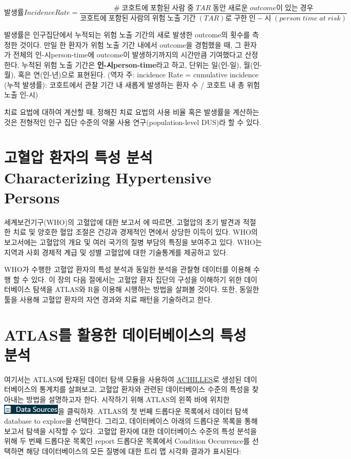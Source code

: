 \documentclass[10.5pt]{book}
\theoremstyle{definition}
\theoremstyle{definition}
\theoremstyle{definition}
\theoremstyle{remark}
\begin{document}
\[
발생률 Incidence Rate= \frac{\#\;코호트에\;포함된\;사람\;중\;TAR\;동안\;새로운\;outcome이\;있는\;경우}{코호트에\;포함된\;사람의\;위험\;노출\;기간\;(TAR)로\;구한\;인-시\;(person\;time\;at\;risk)}
\]

발생률은 인구집단에서 누적되는 위험 노출 기간의 새로 발생한 outcome의
횟수를 측정한 것이다. 만일 한 환자가 위험 노출 기간 내에서 outcome을
경험했을 때, 그 환자가 전체의 인-시person-time에 outcome이
발생하기까지의 시간만큼 기여했다고 산정한다. 누적된 위험 노출 기간은
\textbf{인-시person-time}라고 하고, 단위는 일(인-일), 월(인-월), 혹은
연(인-년)으로 표현된다.   (역자
주: incidence Rate = cumulative incidence (누적 발생률): 코호트에서 관찰
기간 내 새롭게 발생하는 환자 수 / 코호트 내 총 위험 노출 인-시)

치료 요법에 대하여 계산할 때, 정해진 치료 요법의 사용 비율 혹은 발생률을
계산하는 것은 전형적인 인구 집단 수준의 약물 사용 연구(population-level
DUS)라 할 수 있다.

\section{고혈압 환자의 특성 분석 Characterizing Hypertensive
Persons}\label{----characterizing-hypertensive-persons}

세계보건기구(WHO)의 고혈압에 대한 보고서 \citep{WHOHypertension} 에
따르면, 고혈압의 초기 발견과 적절한 치료 및 양호한 혈압 조절은 건강과
경제적인 면에서 상당한 이득이 있다. WHO의 보고서에는 고혈압의 개요 및
여러 국가의 질병 부담의 특징을 보여주고 있다. WHO는 지역과 사회 경제적
계급 및 성별 고혈압에 대한 기술통계를 제공하고 있다.

WHO가 수행한 고혈압 환자의 특성 분석과 동일한 분석을 관찰형 데이터를
이용해 수행 할 수 있다. 이 장의 다음 절에서는 고혈압 환자 집단의 구성을
이해하기 위한 데이터베이스 탐색을 ATLAS와 R을 이용해 시행하는 방법을
살펴볼 것이다. 또한, 동일한 툴을 사용해 고혈압 환자의 자연 경과와 치료
패턴을 기술하려고 한다.

\section{ATLAS를 활용한 데이터베이스의 특성 분석}\label{atlas----}

여기서는 ATLAS에 탑재된 데이터 탐색 모듈을 사용하여
\href{https://github.com/OHDSI/Achilles}{ACHILLES}로 생성된
데이터베이스의 통계치를 살펴보고, 고혈압 환자와 관련된 데이터베이스
수준의 특성을 찾아내는 방법을 설명하고자 한다. 시작하기 위해 ATLAS의
왼쪽 바에 위치한
\includegraphics{images/Characterization/atlasDataSourcesMenuItem.png}을
클릭하자. ATLAS의 첫 번째 드롭다운 목록에서 데이터 탐색database to
explore을 선택한다. 그리고, 데이터베이스 아래의 드롭다운 목록을 통해
보고서 탐색을 시작할 수 있다. 고혈압 환자에 대한 데이터베이스 수준의
특성 분석을 위해 두 번째 드롭다운 목록인 report 드롭다운 목록에서
Condition Occurrence를 선택하면 해당 데이터베이스의 모든 질병에 대한
트리 맵 시각화 결과가 표시된다:
\end{document}
